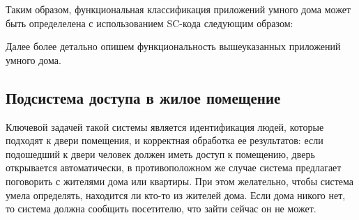 Таким образом, функциональная классификация приложений умного дома может быть определелена с использованием SC-кода следующим образом:
\begin{SCn}
\begin{scnindent}
\begin{scneqtoset}
    \begin{scnindent}
    \end{scnindent}
    \begin{scnindent}
    \end{scnindent}
    \begin{scnindent}
    \end{scnindent}
    \begin{scnindent}
    \end{scnindent}
\end{scneqtoset}
\end{scnindent}
\end{SCn}

Далее более детально опишем функциональность вышеуказанных приложений умного дома.

\subsection{Подсистема доступа в жилое помещение}
Ключевой задачей такой системы является идентификация людей, которые подходят к двери помещения, и корректная обработка ее результатов: если подошедший к двери человек должен иметь доступ к помещению, дверь открывается автоматически, в противоположном же случае система предлагает поговорить с жителями дома или квартиры. При этом желательно, чтобы система умела определять, находится ли кто-то из жителей дома. Если дома никого нет, то система должна сообщить посетителю, что зайти сейчас он не может.

